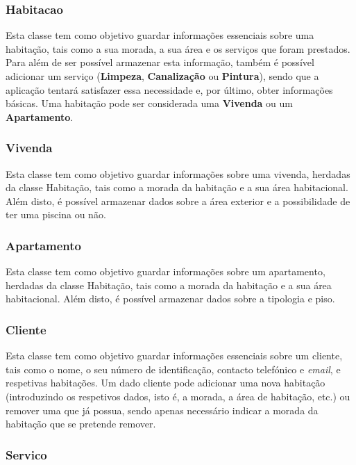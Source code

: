 \documentclass[a4paper]{article}
\begin{document}
\subsubsection{Habitacao}

Esta classe tem como objetivo guardar informações essenciais sobre uma habitação, tais como a sua morada, a sua área e os serviços que foram prestados. Para além de ser possível armazenar esta informação, também é possível adicionar um serviço (\textbf{Limpeza}, \textbf{Canalização} ou \textbf{Pintura}), sendo que a aplicação tentará satisfazer essa necessidade e, por último, obter informações básicas. Uma habitação pode ser considerada uma \textbf{Vivenda} ou um \textbf{Apartamento}.

\subsubsection{Vivenda}

Esta classe tem como objetivo guardar informações sobre uma vivenda, herdadas da classe Habitação, tais como a morada da habitação e a sua área habitacional. Além disto, é possível armazenar dados sobre a área exterior e a possibilidade de ter uma piscina ou não.

\subsubsection{Apartamento}

Esta classe tem como objetivo guardar informações sobre um apartamento, herdadas da classe Habitação, tais como a morada da habitação e a sua área habitacional. Além disto, é possível armazenar dados sobre a tipologia e piso.

\subsubsection{Cliente}

Esta classe tem como objetivo guardar informações essenciais sobre um cliente, tais como o nome, o seu número de identificação, contacto telefónico e \textit{email}, e respetivas habitações. Um dado cliente pode adicionar uma nova habitação (introduzindo os respetivos dados, isto é, a morada, a área de habitação, etc.) ou remover uma que já possua, sendo apenas necessário indicar a morada da habitação que se pretende remover.

\subsubsection{Servico}
\end{document}
